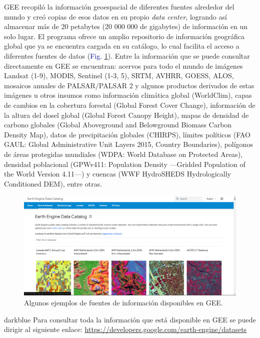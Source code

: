\documentclass[
  12pt,
  letterpaper,
  twoside]{book}
\begin{document}
GEE recopiló la información geoespacial de diferentes fuentes alrededor del mundo y creó copias de esos datos en su propio \emph{data center}, logrando así almacenar más de 20 petabytes (20 000 000 de gigabytes) de información en un solo lugar. El programa ofrece un amplio repositorio de información geográfica global que ya se encuentra cargada en su catálogo, lo cual facilita el acceso a diferentes fuentes de datos (\textcolor{darkblue}{Fig.} \ref{fig:f11}). Entre la información que se puede consultar directamente en GEE se encuentran: acervos para todo el mundo de imágenes Landsat (1-9), MODIS, Sentinel (1-3, 5), SRTM, AVHRR, GOESS, ALOS, mosaicos anuales de PALSAR/PALSAR 2 y algunos productos derivados de estas imágenes u otros insumos como información climática global (WorldClim), capas de cambios en la cobertura forestal (Global Forest Cover Change), información de la altura del dosel global (Global Forest Canopy Height), mapas de densidad de carbono globales (Global Aboveground and Belowground Biomass Carbon Density Map), datos de precipitación globales (CHIRPS), límites políticos (FAO GAUL: Global Administrative Unit Layers 2015, Country Boundaries), polígonos de áreas protegidas mundiales (WDPA: World Database on Protected Areas), densidad poblacional (GPWv411: Population Density ---Gridded Population of the World Version 4.11---) y cuencas (WWF HydroSHEDS Hydrologically Conditioned DEM), entre otras.

\begin{figure}[H]

{\centering \includegraphics[width=0.95\linewidth]{Img/Datasets} 

}

\caption{Algunos ejemplos de fuentes de información disponibles en GEE.}\label{fig:f11}
\end{figure}

\begin{bluebox2}

\begin{awesomeblock}{5pt}{\faLightbulb}{darkblue}
Para consultar toda la información que está disponible en GEE se puede dirigir al siguiente enlace: \url{https://developers.google.com/earth-engine/datasets}

\end{awesomeblock}

\end{bluebox2}
\end{document}

